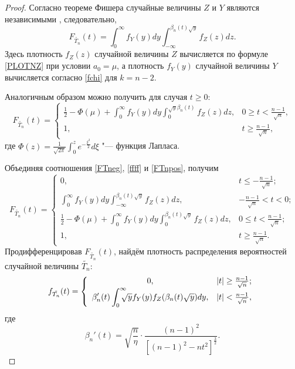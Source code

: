 \begin{proof}
Согласно теореме Фишера случайные величины $Z$ и $Y$ являются независимыми \cite{Aiv}, следовательно,
\begin{equation}\label{ffff}
F_{\tilde{T_n}}(t)=
\int_{0}^{\infty}f_Y(y)dy\int_{-\infty}^{\beta_n(t)\sqrt{y}}
f_Z(z)dz.
\end{equation}
Здесь плотность $f_Z(z)$ случайной величины $Z$ вычисляется по формуле \eqref{PLOTNZ} при условии $a_0=\mu$, а
плотность $f_Y(y)$ случайной величины $Y$ вычисляется согласно \eqref{fchi} для $k=n-2$.

Аналогичным образом можно получить  для случая $t\ge 0$:
\begin{equation}\label{FTnpos}
F_{\tilde{T_n}}(t)=
\left\{
\begin{array}{cr}
\frac{1}{2}
-\Phi(\mu)+
\displaystyle \int_0^{\infty}f_Y(y)dy\int_0^
{\sqrt{y}
\beta_n(t)
}
f_Z(z)dz,& 0\ge t<\frac{n-1}{\sqrt{n}},\\
1,&t\ge\frac{n-1}{\sqrt{n}},
\end{array}
\right.
\end{equation}
где $\Phi(z)=\frac{1}{\sqrt{2\pi}}{\displaystyle \int_0^z}e^{-\frac{\xi^2}{2}}d\xi$ "--- функция Лапласа.

Объединяя соотношения  \eqref{FTneg}, \eqref{ffff} и \eqref{FTnpos}, получим
\begin{equation*}\label{Frez}
F_{\tilde{T_n}}(t)=
\left\{
\begin{array}{cr}
0,& t\le-\frac{n-1}{\sqrt{n}};\\
\displaystyle \int_{0}^{\infty}f_Y(y)dy\int_{-\infty}^{\beta_n(t)\sqrt{y}}
f_Z(z)dz,& -\frac{n-1}{\sqrt{n}}<t<0;\\
\frac12-\Phi(\mu)+ \displaystyle \int_{0}^{\infty}f_Y(y)dy\int_{0}^{\beta_n(t)\sqrt{y}}
f_Z(z)dz,& 0\le t<\frac{n-1}{\sqrt{n}};\\
1,& t\ge \frac{n-1}{\sqrt{n}}.
\end{array}
\right.
\end{equation*}
Продифференцировав  $F_{\tilde{T_n}}(t)$, найдём плотность распределения вероятностей
 случайной величины $\tilde{T_n}$:
\begin{equation}\label{density}
f_{\tilde{T_n}}(t)=
\left\{
\begin{array}{cr}
0,& |t|\ge\frac{n-1}{\sqrt{n}};\\
\displaystyle \beta_n'(t)\int_0^{\infty}\hspace{-3mm}\sqrt{y}f_Y(y)f_Z(\beta_n(t)\sqrt{y})dy,& |t|<\frac{n-1}{\sqrt{n}},\\
\end{array}
\right.
\end{equation}
где
\begin{equation}\label{difbeta}
\beta_n'(t)=\sqrt{\frac{n}{\eta}}\cdot
\frac{(n-1)^2}
{[(n-1)^2-nt^2]^{\frac32}}.
\end{equation}


\end{proof}
